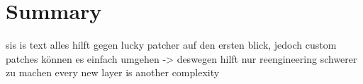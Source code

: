 \section{Summary}\label{section:summary}
sis is text
alles hilft gegen lucky patcher auf den ersten blick, jedoch custom patches können es einfach umgehen -> deswegen hilft nur reengineering schwerer zu machen\newline
every new layer is another complexity\newline
